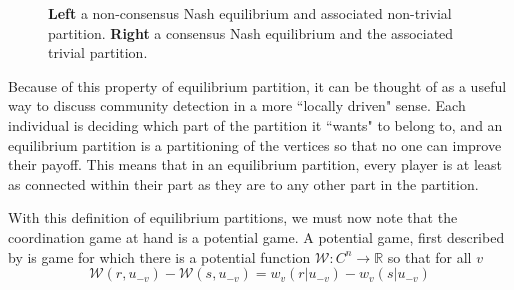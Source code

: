 \documentclass{article}
\begin{document}
\begin{figure}
    \caption{\textbf{Left} a non-consensus Nash equilibrium and associated non-trivial partition. \textbf{Right} a consensus Nash equilibrium and the associated trivial partition.}
    \label{fig:examples}
\end{figure}

Because of this property of equilibrium partition, it can be thought of as a useful way to discuss community detection in a more ``locally driven" sense. Each individual is deciding which part of the partition it ``wants" to belong to, and an equilibrium partition is a partitioning of the vertices so that no one can improve their payoff. This means that in an equilibrium partition, every player is at least as connected within their part as they are to any other part in the partition. 

With this definition of equilibrium partitions, we must now note that the coordination game at hand is a potential game. A potential game, first described by \cite{Monderer1996} is game for which there is a potential function $\mathcal{W}:C^n\to \mathbb{R}$ so that for all $v$
    \begin{equation}\label{eq:PotentialDef}\mathcal{W}(r,u_{-v})-\mathcal{W}(s,u_{-v})=w_{v}(r|u_{-v})-w_v(s|u_{-v})\end{equation}
    
\end{document}
